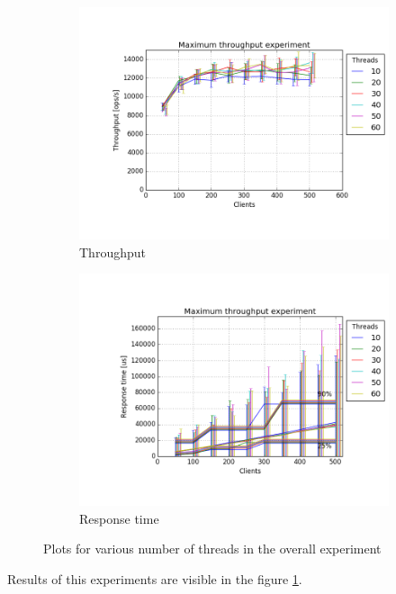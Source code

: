 \documentclass[11pt]{article}
\begin{document}
\begin{figure}
\centering
\begin{subfigure}{\textwidth}
	\centering
	\includegraphics[width=0.95\linewidth]{plots/max_throughput_all_overall}
	\caption{Throughput}
\end{subfigure}
\begin{subfigure}{\textwidth}
	\centering
	\includegraphics[width=0.95\linewidth]{plots/max_throughput-response_time_all_overall}
	\caption{Response time}
\end{subfigure}
\caption{Plots for various number of threads in the overall experiment}
\label{fig:max-throughput-overall}
\end{figure}

Results of this experiments are visible in the figure \ref{fig:max-throughput-overall}.
\end{document}
